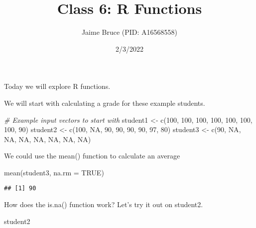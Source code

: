 \documentclass[
]{article}
\title{Class 6: R Functions}
\author{Jaime Bruce (PID: A16568558)}
\date{2/3/2022}
\newenvironment{Shaded}{\begin{snugshade}}{\end{snugshade}}
\newcommand{\AttributeTok}[1]{\textcolor[rgb]{0.77,0.63,0.00}{#1}}
\newcommand{\CommentTok}[1]{\textcolor[rgb]{0.56,0.35,0.01}{\textit{#1}}}
\newcommand{\ConstantTok}[1]{\textcolor[rgb]{0.00,0.00,0.00}{#1}}
\newcommand{\DecValTok}[1]{\textcolor[rgb]{0.00,0.00,0.81}{#1}}
\newcommand{\FunctionTok}[1]{\textcolor[rgb]{0.00,0.00,0.00}{#1}}
\newcommand{\NormalTok}[1]{#1}
\newcommand{\OtherTok}[1]{\textcolor[rgb]{0.56,0.35,0.01}{#1}}
\begin{document}
\maketitle

Today we will explore R functions.

We will start with calculating a grade for these example students.

\begin{Shaded}
\begin{Highlighting}[]
\CommentTok{\# Example input vectors to start with}
\NormalTok{student1 }\OtherTok{\textless{}{-}} \FunctionTok{c}\NormalTok{(}\DecValTok{100}\NormalTok{, }\DecValTok{100}\NormalTok{, }\DecValTok{100}\NormalTok{, }\DecValTok{100}\NormalTok{, }\DecValTok{100}\NormalTok{, }\DecValTok{100}\NormalTok{, }\DecValTok{100}\NormalTok{, }\DecValTok{90}\NormalTok{)}
\NormalTok{student2 }\OtherTok{\textless{}{-}} \FunctionTok{c}\NormalTok{(}\DecValTok{100}\NormalTok{, }\ConstantTok{NA}\NormalTok{, }\DecValTok{90}\NormalTok{, }\DecValTok{90}\NormalTok{, }\DecValTok{90}\NormalTok{, }\DecValTok{90}\NormalTok{, }\DecValTok{97}\NormalTok{, }\DecValTok{80}\NormalTok{)}
\NormalTok{student3 }\OtherTok{\textless{}{-}} \FunctionTok{c}\NormalTok{(}\DecValTok{90}\NormalTok{, }\ConstantTok{NA}\NormalTok{, }\ConstantTok{NA}\NormalTok{, }\ConstantTok{NA}\NormalTok{, }\ConstantTok{NA}\NormalTok{, }\ConstantTok{NA}\NormalTok{, }\ConstantTok{NA}\NormalTok{, }\ConstantTok{NA}\NormalTok{)}
\end{Highlighting}
\end{Shaded}

We could use the mean() function to calculate an average

\begin{Shaded}
\begin{Highlighting}[]
\FunctionTok{mean}\NormalTok{(student3, }\AttributeTok{na.rm =} \ConstantTok{TRUE}\NormalTok{)}
\end{Highlighting}
\end{Shaded}

\begin{verbatim}
## [1] 90
\end{verbatim}

How does the is.na() function work? Let's try it out on student2.

\begin{Shaded}
\begin{Highlighting}[]
\NormalTok{student2}
\end{Highlighting}
\end{Shaded}
\end{document}
